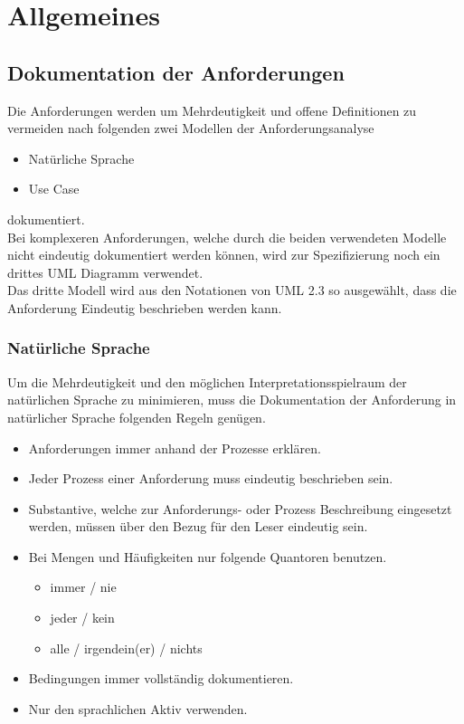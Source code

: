 \section{Allgemeines}

\subsection{Dokumentation der Anforderungen}

Die Anforderungen werden um Mehrdeutigkeit und offene Definitionen zu vermeiden nach folgenden zwei Modellen der Anforderungsanalyse

\begin{itemize}
	\item Natürliche Sprache
	\item Use Case
\end{itemize}

dokumentiert. \\
Bei komplexeren Anforderungen, welche durch die beiden verwendeten Modelle nicht eindeutig dokumentiert werden können, wird zur Spezifizierung noch ein drittes UML Diagramm verwendet. \\

Das dritte Modell wird aus den Notationen von UML 2.3 so ausgewählt, dass die Anforderung Eindeutig beschrieben werden kann.

\subsubsection{Natürliche Sprache}

Um die Mehrdeutigkeit und den möglichen Interpretationsspielraum der natürlichen Sprache zu minimieren, muss die Dokumentation der Anforderung in natürlicher Sprache folgenden Regeln genügen.

\begin{itemize}
	\item Anforderungen immer anhand der Prozesse erklären.
	\item Jeder Prozess einer Anforderung muss eindeutig beschrieben sein.
	\item Substantive, welche zur Anforderungs- oder Prozess Beschreibung eingesetzt werden, müssen über den Bezug für den Leser eindeutig sein.
	\item Bei Mengen und Häufigkeiten nur folgende Quantoren benutzen.
	\begin{itemize}
		\item immer / nie
		\item jeder / kein
		\item alle / irgendein(er) / nichts
	\end{itemize}
	\item Bedingungen immer vollständig dokumentieren.
	\item Nur den sprachlichen Aktiv verwenden.
\end{itemize}

